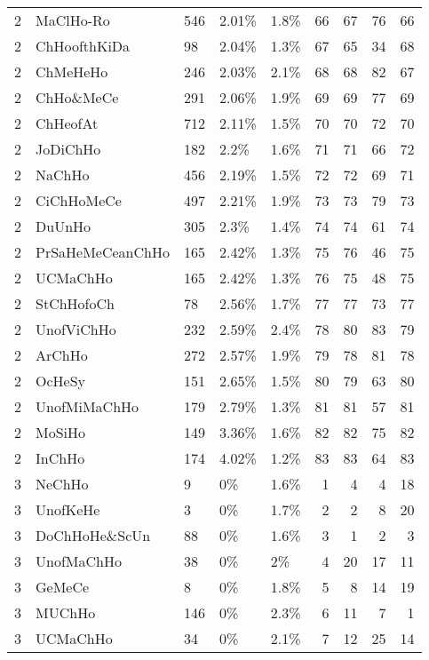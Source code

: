 \begin{longtable}{lllllrrrr}
  2 & MaClHo-Ro & 546 & 2.01\% & 1.8\% &  66 &  67 &  76 &  66 \\ 
  2 & ChHoofthKiDa & 98 & 2.04\% & 1.3\% &  67 &  65 &  34 &  68 \\ 
  2 & ChMeHeHo & 246 & 2.03\% & 2.1\% &  68 &  68 &  82 &  67 \\ 
  2 & ChHo\&MeCe & 291 & 2.06\% & 1.9\% &  69 &  69 &  77 &  69 \\ 
  2 & ChHeofAt & 712 & 2.11\% & 1.5\% &  70 &  70 &  72 &  70 \\ 
  2 & JoDiChHo & 182 & 2.2\% & 1.6\% &  71 &  71 &  66 &  72 \\ 
  2 & NaChHo & 456 & 2.19\% & 1.5\% &  72 &  72 &  69 &  71 \\ 
  2 & CiChHoMeCe & 497 & 2.21\% & 1.9\% &  73 &  73 &  79 &  73 \\ 
  2 & DuUnHo & 305 & 2.3\% & 1.4\% &  74 &  74 &  61 &  74 \\ 
  2 & PrSaHeMeCeanChHo & 165 & 2.42\% & 1.3\% &  75 &  76 &  46 &  75 \\ 
  2 & UCMaChHo & 165 & 2.42\% & 1.3\% &  76 &  75 &  48 &  75 \\ 
  2 & StChHofoCh & 78 & 2.56\% & 1.7\% &  77 &  77 &  73 &  77 \\ 
  2 & UnofViChHo & 232 & 2.59\% & 2.4\% &  78 &  80 &  83 &  79 \\ 
  2 & ArChHo & 272 & 2.57\% & 1.9\% &  79 &  78 &  81 &  78 \\ 
  2 & OcHeSy & 151 & 2.65\% & 1.5\% &  80 &  79 &  63 &  80 \\ 
  2 & UnofMiMaChHo & 179 & 2.79\% & 1.3\% &  81 &  81 &  57 &  81 \\ 
  2 & MoSiHo & 149 & 3.36\% & 1.6\% &  82 &  82 &  75 &  82 \\ 
  2 & InChHo & 174 & 4.02\% & 1.2\% &  83 &  83 &  64 &  83 \\ 
  3 & NeChHo & 9 & 0\% & 1.6\% &   1 &   4 &   4 &  18 \\ 
  3 & UnofKeHe & 3 & 0\% & 1.7\% &   2 &   2 &   8 &  20 \\ 
  3 & DoChHoHe\&ScUn & 88 & 0\% & 1.6\% &   3 &   1 &   2 &   3 \\ 
  3 & UnofMaChHo & 38 & 0\% & 2\% &   4 &  20 &  17 &  11 \\ 
  3 & GeMeCe & 8 & 0\% & 1.8\% &   5 &   8 &  14 &  19 \\ 
  3 & MUChHo & 146 & 0\% & 2.3\% &   6 &  11 &   7 &   1 \\ 
  3 & UCMaChHo & 34 & 0\% & 2.1\% &   7 &  12 &  25 &  14 \\ 

\end{longtable}
